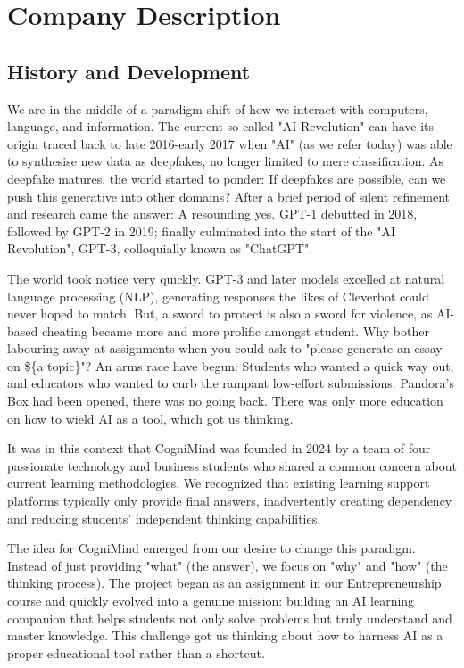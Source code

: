 \def\code#1{\texttt{#1}}

\section{Company Description}

\subsection{History and Development}
We are in the middle of a paradigm shift of how we interact with computers, language, and information. The current so-called "AI Revolution" can have its origin traced back to late 2016-early 2017 when "AI" (as we refer today) was able to synthesise new data as deepfakes, no longer limited to mere classification. As deepfake matures, the world started to ponder: If deepfakes are possible, can we push this generative into other domains? After a brief period of silent refinement and research came the answer: A resounding yes. GPT-1 debutted in 2018, followed by GPT-2 in 2019; finally culminated into the start of the "AI Revolution", GPT-3, colloquially known as "ChatGPT".

The world took notice very quickly. GPT-3 and later models excelled at natural language processing (NLP), generating responses the likes of Cleverbot could never hoped to match. But, a sword to protect is also a sword for violence, as AI-based cheating became more and more prolific amongst student. Why bother labouring away at assignments when you could ask to "please generate an essay on \$\{a topic\}"? An arms race have begun: Students who wanted a quick way out, and educators who wanted to curb the rampant low-effort submissions. Pandora's Box had been opened, there was no going back. There was only more education on how to wield AI as a tool, which got us thinking.

It was in this context that CogniMind was founded in 2024 by a team of four passionate technology and business students who shared a common concern about current learning methodologies. We recognized that existing learning support platforms typically only provide final answers, inadvertently creating dependency and reducing students' independent thinking capabilities.

The idea for CogniMind emerged from our desire to change this paradigm. Instead of just providing "what" (the answer), we focus on "why" and "how" (the thinking process). The project began as an assignment in our Entrepreneurship course and quickly evolved into a genuine mission: building an AI learning companion that helps students not only solve problems but truly understand and master knowledge. This challenge got us thinking about how to harness AI as a proper educational tool rather than a shortcut.

